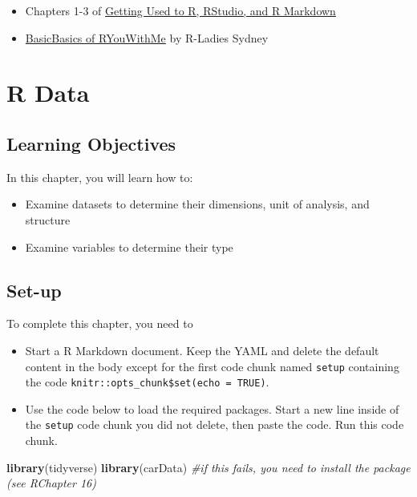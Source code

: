 \documentclass[
]{book}
\makeatletter
\newenvironment{Shaded}{\begin{snugshade}}{\end{snugshade}}
\newcommand{\CommentTok}[1]{\textcolor[rgb]{0.37,0.37,0.37}{\textit{#1}}}
\newcommand{\FunctionTok}[1]{\textcolor[rgb]{0.27,0.27,0.27}{\textbf{#1}}}
\newcommand{\NormalTok}[1]{#1}
\providecommand{\tightlist}{%
  \setlength{\itemsep}{0pt}\setlength{\parskip}{0pt}}
\newenvironment{kframe}{%
\medskip{}
\setlength{\fboxsep}{.8em}
 \def\at@end@of@kframe{}%
 \ifinner\ifhmode%
  \def\at@end@of@kframe{\end{minipage}}%
  \begin{minipage}{\columnwidth}%
 \fi\fi%
 \def\FrameCommand##1{\hskip\@totalleftmargin \hskip-\fboxsep
 \colorbox{shadecolor}{##1}\hskip-\fboxsep
     \hskip-\linewidth \hskip-\@totalleftmargin \hskip\columnwidth}%
 \MakeFramed {\advance\hsize-\width
   \@totalleftmargin\z@ \linewidth\hsize
   \@setminipage}}%
 {\par\unskip\endMakeFramed%
 \at@end@of@kframe}
\renewenvironment{Shaded}{\begin{kframe}}{\end{kframe}}
\makeatother
\begin{document}
\begin{itemize}
\tightlist
\item
  Chapters 1-3 of \href{https://rbasics.netlify.app/index.html}{Getting Used to R, RStudio, and R Markdown}
\item
  \href{https://rladiessydney.org/courses/ryouwithme/01-basicbasics-0/}{BasicBasics of RYouWithMe} by R-Ladies Sydney
\end{itemize}

\hypertarget{r-data}{%
\chapter{R Data}\label{r-data}}

\hypertarget{learning-objectives}{%
\section{Learning Objectives}\label{learning-objectives}}

In this chapter, you will learn how to:

\begin{itemize}
\tightlist
\item
  Examine datasets to determine their dimensions, unit of analysis, and structure
\item
  Examine variables to determine their type
\end{itemize}

\hypertarget{set-up}{%
\section{Set-up}\label{set-up}}

To complete this chapter, you need to

\begin{itemize}
\tightlist
\item
  Start a R Markdown document. Keep the YAML and delete the default content in the body except for the first code chunk named \texttt{setup} containing the code \texttt{knitr::opts\_chunk\$set(echo\ =\ TRUE)}.
\item
  Use the code below to load the required packages. Start a new line inside of the \texttt{setup} code chunk you did not delete, then paste the code. Run this code chunk.
\end{itemize}

\begin{Shaded}
\begin{Highlighting}[]
\FunctionTok{library}\NormalTok{(tidyverse)}
\FunctionTok{library}\NormalTok{(carData)  }\CommentTok{\#if this fails, you need to install the package (see RChapter 16)}
\end{Highlighting}
\end{Shaded}
\end{document}
